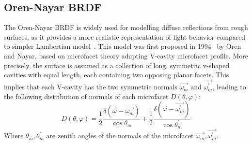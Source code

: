 \begin{itemize}
\end{itemize}

\subsection{Oren-Nayar BRDF}\label{subsec: oren-nayar-model}

The Oren-Nayar BRDF is widely used for modelling diffuse reflections from rough surfaces, as it provides a more realistic representation of light behavior compared to simpler Lambertian model~\cite{1995_Oren,1995_Oren,2010_Roser}.
This model was first proposed in 1994~\cite{1995_Oren} by Oren and Nayar, based on microfacet theory adapting V-cavity microfacet profile.
More precisely, the surface is assumed as a collection of long, symmetric v-shaped cavities with equal length, each containing two opposing planar facets.
This implies that each V-cavity has the two symmetric normals $\overrightarrow{\omega_m}$ and $\overrightarrow{\omega_m^\prime}$, leading to the following distribution of normals of each microfacet $D(\theta, \varphi)$:
\[
    D(\theta, \varphi) = \frac{1}{2} \frac{\delta(\overrightarrow{\omega} - \overrightarrow{\omega_m})}{\cos \theta_m}%
    + \frac{1}{2} \frac{\delta(\overrightarrow{\omega} - \overrightarrow{\omega_m^\prime})}{\cos\theta_m^\prime}
\]
Where $\theta_m, \theta_m^\prime$ are zenith angles of the normals of the microfacet $\overrightarrow{\omega_m}, \overrightarrow{\omega_m^\prime}$.

